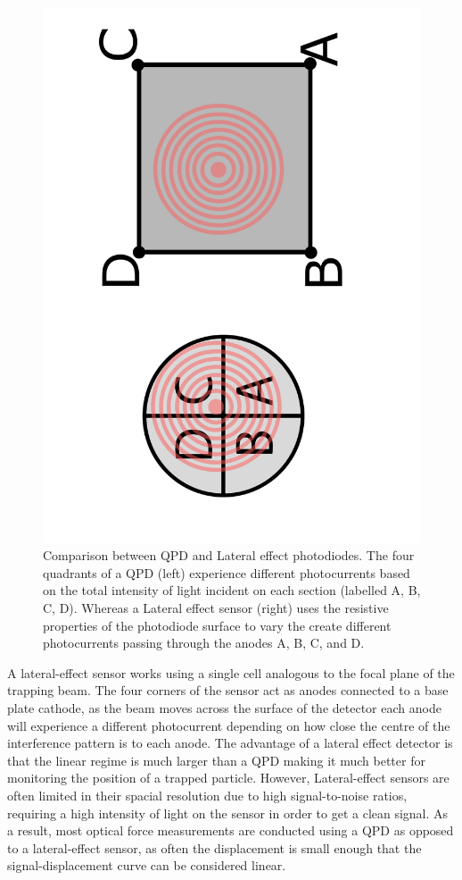 \begin{figure}[h!]
	\centering
	\includegraphics[height=\linewidth, angle=270]{QPD_Lateral_effect.pdf}
	\caption{Comparison between QPD and Lateral effect photodiodes.
		The four quadrants of a QPD (left) experience different photocurrents
		based on the total intensity of light incident on each section 
		(labelled A, B, C, D). 
		Whereas a Lateral effect sensor (right) uses the resistive properties
		of the photodiode surface to vary the create different photocurrents 
		passing through the anodes A, B, C, and D.}
\end{figure}

A lateral-effect sensor works using a single cell analogous to the focal plane of the trapping beam. The four corners of the sensor act as anodes connected to a base plate cathode, as the beam moves across the surface of the detector each anode will experience a different photocurrent depending 
on how close the centre of the interference pattern is to each anode. 
The advantage of a lateral effect detector is that the linear regime 
is much larger than a QPD making it much better for monitoring the 
position of a trapped particle. However, Lateral-effect sensors are 
often limited in their spacial resolution due to high signal-to-noise 
ratios, requiring a high intensity of light on the sensor in order to 
get a clean signal. As a result, most optical force measurements are 
conducted using a QPD as opposed to a lateral-effect sensor, as often 
the displacement is small enough that the signal-displacement curve 
can be considered linear.

